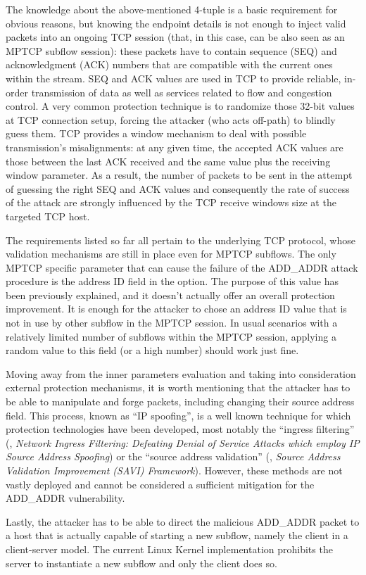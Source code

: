 The knowledge about the above-mentioned 4-tuple is a basic requirement for obvious reasons, but knowing the endpoint details is not enough to inject valid packets into an ongoing TCP session (that, in this case, can be also seen as an MPTCP subflow session): these packets have to contain sequence (SEQ) and acknowledgment (ACK) numbers that are compatible with the current ones within the stream. SEQ and ACK values are used in TCP to provide reliable, in-order transmission of data as well as services related to flow and congestion control. A very common protection technique is to randomize those 32-bit values at TCP connection setup, forcing the attacker (who acts off-path) to blindly guess them. TCP provides a window mechanism to deal with possible transmission's misalignments: at any given time, the accepted ACK values are those between the last ACK received and the same value plus the receiving window parameter. As a result, the number of packets to be sent in the attempt of guessing the right SEQ and ACK values and consequently the rate of success of the attack are strongly influenced by the TCP receive windows size at the targeted TCP host.

The requirements listed so far all pertain to the underlying TCP protocol, whose validation mechanisms are still in place even for MPTCP subflows. The only MPTCP specific parameter that can cause the failure of the ADD\_ADDR attack procedure is the address ID field in the option. The purpose of this value has been previously explained, and it doesn't actually offer an overall protection improvement. It is enough for the attacker to chose an address ID value that is not in use by other subflow in the MPTCP session. In usual scenarios with a relatively limited number of subflows within the MPTCP session, applying a random value to this field (or a high number) should work just fine.

Moving away from the inner parameters evaluation and taking into consideration external protection mechanisms, it is worth mentioning that the attacker has to be able to manipulate and forge packets, including changing their source address field. This process, known as ``IP spoofing'', is a well known technique for which protection technologies have been developed, most notably the ``ingress filtering'' (, \textit{Network Ingress Filtering: Defeating Denial of Service Attacks which employ IP Source Address Spoofing}) or the ``source address validation'' (, \textit{Source Address Validation Improvement (SAVI) Framework}). However, these methods are not vastly deployed and cannot be considered a sufficient mitigation for the ADD\_ADDR vulnerability. %

Lastly, the attacker has to be able to direct the malicious ADD\_ADDR packet to a host that is actually capable of starting a new subflow, namely the client in a client-server model. The current Linux Kernel implementation prohibits the server to instantiate a new subflow and only the client does so.
